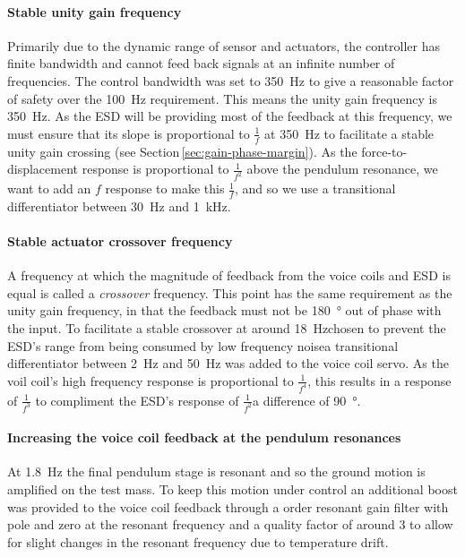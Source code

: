 \paragraph{Stable unity gain frequency}
Primarily due to the dynamic range of sensor and actuators, the controller has finite bandwidth and cannot feed back signals at an infinite number of frequencies. The control bandwidth was set to \SI{350}{\hertz} to give a reasonable factor of safety over the \SI{100}{\hertz} requirement. This means the unity gain frequency is \SI{350}{\hertz}. As the \gls{ESD} will be providing most of the feedback at this frequency, we must ensure that its slope is proportional to $\frac{1}{f}$ at \SI{350}{\hertz} to facilitate a stable unity gain crossing (see Section\,\ref{sec:gain-phase-margin}). As the force-to-displacement response is proportional to $\frac{1}{f^2}$ above the pendulum resonance, we want to add an $f$ response to make this $\frac{1}{f}$, and so we use a transitional differentiator between \SI{30}{\hertz} and \SI{1}{\kilo\hertz}.

\paragraph{Stable actuator crossover frequency}
A frequency at which the magnitude of feedback from the voice coils and \gls{ESD} is equal is called a \emph{crossover} frequency. This point has the same requirement as the unity gain frequency, in that the feedback must not be \SI{180}{\degree} out of phase with the input. To facilitate a stable crossover at around \SI{18}{\hertz}\textemdash chosen to prevent the \gls{ESD}'s range from being consumed by low frequency noise\textemdash a transitional differentiator between \SI{2}{\hertz} and \SI{50}{\hertz} was added to the voice coil servo. As the voil coil's high frequency response is proportional to $\frac{1}{f^4}$, this results in a response of $\frac{1}{f^3}$ to compliment the \gls{ESD}'s response of $\frac{1}{f^2}$\textemdash a difference of \SI{90}{\degree}.

\paragraph{Increasing the voice coil feedback at the pendulum resonances}
At \SI{1.8}{\hertz} the final pendulum stage is resonant and so the ground motion is amplified on the test mass. To keep this motion under control an additional boost was provided to the voice coil feedback through a  order resonant gain filter with pole and zero at the resonant frequency and a quality factor of around \num{3} to allow for slight changes in the resonant frequency due to temperature drift.

